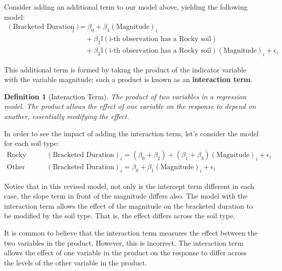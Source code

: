 \documentclass[
]{book}
\theoremstyle{plain}
\theoremstyle{mydefn}
\newtheorem{definition}{Definition}[chapter]
\theoremstyle{myexmpl}
\theoremstyle{remark}
\begin{document}
Consider adding an additional term to our model above, yielding the following model:
\[
\begin{aligned}
  (\text{Bracketed Duration})_i &= \beta_0 + \beta_1(\text{Magnitude})_i \\
    &\quad + \beta_2\mathbb{I}(\text{i-th observation has a Rocky soil}) \\
    &\quad + \beta_3\mathbb{I}(\text{i-th observation has a Rocky soil})(\text{Magnitude})_i + \epsilon_i
\end{aligned}
\]

This additional term is formed by taking the product of the indicator variable with the variable magnitude; such a product is known as an \textbf{interaction term}.

\begin{definition}[Interaction Term]
\protect\hypertarget{def:defn-interaction-term}{}{\label{def:defn-interaction-term} {} }The product of two variables in a regression model. The product allows the effect of one variable on the response to depend on another, essentially modifying the effect.
\end{definition}

In order to see the impact of adding the interaction term, let's consider the model for each soil type:
\[
\begin{aligned}
  \text{Rocky Soil:} &\quad (\text{Bracketed Duration})_i = \left(\beta_0 + \beta_2\right) + \left(\beta_1 + \beta_3\right)(\text{Magnitude})_i + \epsilon_i\\
  \text{Other Soil:} &\quad (\text{Bracketed Duration})_i = \beta_0 + \beta_1(\text{Magnitude})_i + \epsilon_i
\end{aligned}
\]

Notice that in this revised model, not only is the intercept term different in each case, the slope term in front of the magnitude differs also. The model with the interaction term allows the effect of the magnitude on the bracketed duration to be modified by the soil type. That is, the effect differs across the soil type.

\begin{rmdtip}
It is common to believe that the interaction term measures the effect between the two variables in the product. However, this is incorrect. The interaction term allows the effect of one variable in the product on the response to differ across the levels of the other variable in the product.
\end{rmdtip}
\end{document}
